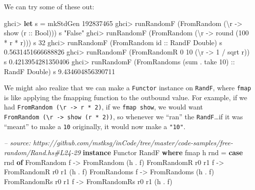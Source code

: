 \documentclass[]{article}
\newenvironment{Shaded}{\begin{snugshade}}{\end{snugshade}}
\newcommand{\CommentTok}[1]{\textcolor[rgb]{0.56,0.35,0.01}{\textit{#1}}}
\newcommand{\DataTypeTok}[1]{\textcolor[rgb]{0.13,0.29,0.53}{#1}}
\newcommand{\DecValTok}[1]{\textcolor[rgb]{0.00,0.00,0.81}{#1}}
\newcommand{\FloatTok}[1]{\textcolor[rgb]{0.00,0.00,0.81}{#1}}
\newcommand{\FunctionTok}[1]{\textcolor[rgb]{0.00,0.00,0.00}{#1}}
\newcommand{\KeywordTok}[1]{\textcolor[rgb]{0.13,0.29,0.53}{\textbf{#1}}}
\newcommand{\NormalTok}[1]{#1}
\newcommand{\OtherTok}[1]{\textcolor[rgb]{0.56,0.35,0.01}{#1}}
\newcommand{\StringTok}[1]{\textcolor[rgb]{0.31,0.60,0.02}{#1}}
\begin{document}
We can try some of these out:

\begin{Shaded}
\begin{Highlighting}[]
\NormalTok{ghci}\FunctionTok{>} \KeywordTok{let}\NormalTok{ s }\FunctionTok{=}\NormalTok{ mkStdGen }\DecValTok{192837465}
\NormalTok{ghci}\FunctionTok{>}\NormalTok{ runRandomF (}\DataTypeTok{FromRandom}\NormalTok{ (\textbackslash{}r }\OtherTok{->}\NormalTok{ show (}\OtherTok{r ::} \DataTypeTok{Bool}\NormalTok{))) s}
\StringTok{"False"}
\NormalTok{ghci}\FunctionTok{>}\NormalTok{ runRandomF (}\DataTypeTok{FromRandom}\NormalTok{ (\textbackslash{}r }\OtherTok{->}\NormalTok{ round (}\DecValTok{100} \FunctionTok{*}\NormalTok{ r }\FunctionTok{*}\NormalTok{ r))) s}
\DecValTok{32}
\NormalTok{ghci}\FunctionTok{>}\NormalTok{ runRandomF (}\DataTypeTok{FromRandom}\OtherTok{ id ::} \DataTypeTok{RandF} \DataTypeTok{Double}\NormalTok{) s}
\FloatTok{0.5631451666688826}
\NormalTok{ghci}\FunctionTok{>}\NormalTok{ runRandomF (}\DataTypeTok{FromRandomR} \DecValTok{0} \DecValTok{10}\NormalTok{ (\textbackslash{}r }\OtherTok{->} \DecValTok{1} \FunctionTok{/}\NormalTok{ sqrt r)) s}
\FloatTok{0.4213954281350406}
\NormalTok{ghci}\FunctionTok{>}\NormalTok{ runRandomF (}\DataTypeTok{FromRandoms}\NormalTok{ (sum }\FunctionTok{.}\NormalTok{ take }\DecValTok{10}\NormalTok{)}\OtherTok{ ::} \DataTypeTok{RandF} \DataTypeTok{Double}\NormalTok{) s}
\FloatTok{9.434604856390711}
\end{Highlighting}
\end{Shaded}

We might also realize that we can make a \texttt{Functor} instance on
\texttt{RandF}, where \texttt{fmap} is like applying the fmapping function to
the outbound value. For example, if we had
\texttt{FromRandom\ (\textbackslash{}r\ -\textgreater{}\ r\ *\ 2)}, if we
\texttt{fmap\ show}, we would want
\texttt{FromRandom\ (\textbackslash{}r\ -\textgreater{}\ show\ (r\ *\ 2))}, so
whenever we ``ran'' the \texttt{RandF}\ldots{}if it was ``meant'' to make a
\texttt{10} originally, it would now make a \texttt{"10"}.

\begin{Shaded}
\begin{Highlighting}[]
\CommentTok{-- source: https://github.com/mstksg/inCode/tree/master/code-samples/free-random/Rand.hs#L24-29}
\KeywordTok{instance} \DataTypeTok{Functor} \DataTypeTok{RandF} \KeywordTok{where}
\NormalTok{    fmap h rnd }\FunctionTok{=} \KeywordTok{case}\NormalTok{ rnd }\KeywordTok{of}
        \DataTypeTok{FromRandom}\NormalTok{         f }\OtherTok{->} \DataTypeTok{FromRandom}\NormalTok{         (h }\FunctionTok{.}\NormalTok{ f)}
        \DataTypeTok{FromRandomR}\NormalTok{ r0 r1  f }\OtherTok{->} \DataTypeTok{FromRandomR}\NormalTok{ r0 r1  (h }\FunctionTok{.}\NormalTok{ f)}
        \DataTypeTok{FromRandoms}\NormalTok{        f }\OtherTok{->} \DataTypeTok{FromRandoms}\NormalTok{        (h }\FunctionTok{.}\NormalTok{ f)}
        \DataTypeTok{FromRandomRs}\NormalTok{ r0 r1 f }\OtherTok{->} \DataTypeTok{FromRandomRs}\NormalTok{ r0 r1 (h }\FunctionTok{.}\NormalTok{ f)}
\end{Highlighting}
\end{Shaded}
\end{document}
